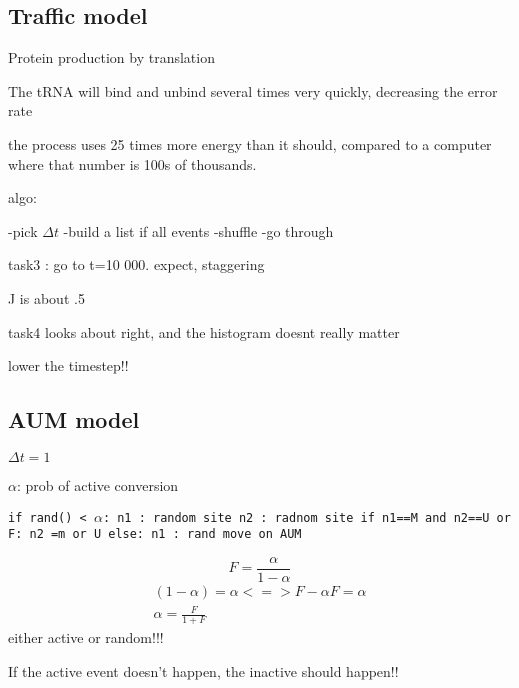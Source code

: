 \documentclass{article}
\begin{document}
\subsection{Traffic model}
Protein production  by translation

The tRNA will bind and unbind several times very quickly, decreasing the error rate

the process uses 25 times more energy than it should, compared to a computer where that number is 100s of thousands. 

algo: 

-pick $\Delta t$
-build a list if all events
-shuffle
-go through


task3 : go to t=10 000. expect, staggering

J is about .5 


task4 looks about right, and the histogram doesnt really matter

lower the timestep!!

\subsection{AUM model}
$\Delta t = 1$

$\alpha$: prob of active conversion

\texttt{if rand() < $\alpha$: 
	n1 : random site
	n2 : radnom site
	if n1==M and n2==U or F: 
		n2 =m or U
	else: 
		n1 : rand
		move on AUM}

\begin{equation}
	F = \frac{\alpha }{1-\alpha}
\end{equation}
\begin{equation}
	\begin{split}
	(1-\alpha ) = \alpha <=>F - \alpha F=\alpha\\
	\alpha = \frac{F}{1+F}
	\end{split}
\end{equation}
either active or random!!!

If the active event doesn't happen, the inactive should happen!!
\end{document}
